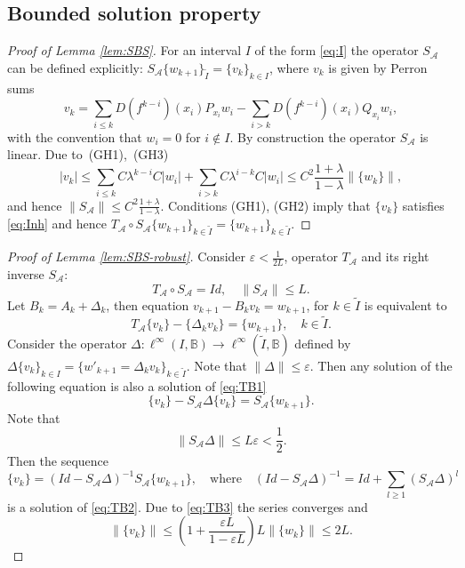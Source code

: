\documentclass[12pt]{article}
\newcommand{\Bb}{\mathbb{B}}
\theoremstyle{definition}
\begin{document}
\subsection{Bounded solution property}\label{sec:BS}

\begin{proof}[Proof of Lemma \ref{lem:SBS}]
For an interval $I$ of the form \eqref{eq:I} the operator $S_{\mathcal{A}}$ can be defined explicitly: $S_{\mathcal{A}}\{w_{k+1}\}_{\tilde{I}} = \{v_k\}_{k \in I}$,
where $v_k$ is given by Perron sums
\begin{equation}\label{eq:Perron}
v_k = \sum_{i \leq k} D(f^{k-i})(x_i) P_{x_i}w_i -\sum_{i>k}D(f^{k-i})(x_i)Q_{x_i}w_i,   
\end{equation}
with the convention that $w_i = 0$ for $i \notin I$.
By construction the operator $S_{\mathcal{A}}$ is linear.
Due to~(GH1),~(GH3)
$$
|v_k| \leq \sum_{i \leq k} C \lambda^{k-i}C|w_i| + \sum_{i>k} C \lambda^{i-k}C|w_i| \leq C^2 \frac{1+\lambda}{1-\lambda}\|\{w_k\}\|,
$$
and hence $\|S_{\mathcal{A}}\| \leq C^2 \frac{1+\lambda}{1-\lambda}$. Conditions (GH1), (GH2) imply that $\{v_k\}$ satisfies \eqref{eq:Inh} and hence 
$
T_{\mathcal{A}} \circ S_{\mathcal{A}} \{w_{k+1}\}_{k \in \tilde{I}} = \{w_{k+1}\}_{k \in \tilde{I}}.
$
\end{proof}

\begin{proof}[Proof of Lemma \ref{lem:SBS-robust}]
Consider $\varepsilon < \frac{1}{2L}$, operator $T_{\mathcal{A}}$ and its right inverse $S_{\mathcal{A}}$:
$$
T_{\mathcal{A}} \circ S_{\mathcal{A}} = Id, \quad \|S_{\mathcal{A}}\| \leq L.
$$
Let $B_k = A_k + \Delta_k$, then equation
$
v_{k+1} - B_kv_k = w_{k+1}$, for $k \in \tilde{I}
$
is equivalent to
\begin{equation}\label{eq:TB1}
T_{\mathcal{A}}\{v_k\} - \{\Delta_k v_k\} = \{w_{k+1}\}, \quad k \in \tilde{I}.    
\end{equation}
Consider the operator $\Delta: \ell^{\infty}(I, \Bb) \to \ell^{\infty}(\tilde{I}, \Bb)$ defined by
$\Delta \{v_k\}_{k \in I} = \{w'_{k+1} = \Delta_k v_k\}_{k \in \tilde{I}}$. Note that $\| \Delta \| \leq \varepsilon$. 
Then any solution of the following equation is also a solution of \eqref{eq:TB1}
\begin{equation}\label{eq:TB2}
\{v_k\} - S_{\mathcal{A}}\Delta \{v_k\} = S_{\mathcal{A}}\{w_{k+1}\}.
\end{equation}
Note that 
\begin{equation}\label{eq:TB3}
\|S_{\mathcal{A}}\Delta\|\leq L\varepsilon < \frac{1}{2}.
\end{equation}
Then the sequence
$$
\{v_k\} = (Id - S_{\mathcal{A}}\Delta)^{-1}S_{\mathcal{A}}\{w_{k+1}\}, \quad \mbox{where} \quad (Id - S_{\mathcal{A}}\Delta)^{-1} = Id +\sum_{l \geq 1} (S_{\mathcal{A}}\Delta)^l
$$
is a solution of \eqref{eq:TB2}. Due to \eqref{eq:TB3} the series converges and
$$
\|\{v_k\}\| \leq \left(1+\frac{\varepsilon L}{1-\varepsilon L}\right)L \|\{w_k\}\| \leq 2L.
$$
\end{proof}
\end{document}
